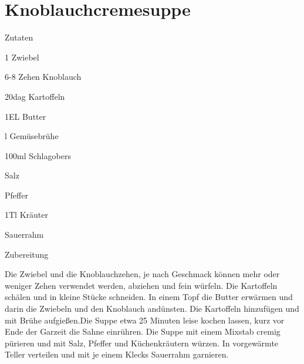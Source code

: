 \chapter*{Knoblauchcremesuppe}
\begin{multicols}{2}
 {\Large Zutaten}
 \begin{Zutaten}
		\item 1 Zwiebel
		\item 6-8 Zehen Knoblauch
		\item 20dag Kartoffeln
		\item 1EL Butter
		\item {}l Gemüsebrühe
		\item 100ml Schlagobers
		\item Salz
		\item Pfeffer
		\item 1Tl Kräuter
		\item Sauerrahm
		
		
				
		
\end{Zutaten}
\columnbreak
{}
\end{multicols}

{\Large Zubereitung} \newline
\begin{addmargin}[1cm]{0cm}
	Die Zwiebel und die Knoblauchzehen, je nach Geschmack können mehr oder weniger Zehen verwendet werden, abziehen und fein würfeln. Die Kartoffeln schälen und in kleine Stücke schneiden.\newline
	In einem Topf die Butter erwärmen und darin die Zwiebeln und den Knoblauch andünsten. Die Kartoffeln
	hinzufügen und mit Brühe aufgießen.\newline Die Suppe etwa 25 Minuten leise kochen lassen, kurz vor Ende der
	Garzeit die Sahne einrühren.\newline
	Die Suppe mit einem Mixstab cremig pürieren und mit Salz, Pfeffer und Küchenkräutern würzen. \newline In
	vorgewärmte Teller verteilen und mit je einem Klecks Sauerrahm garnieren.
	
	
	
	
\end{addmargin}
